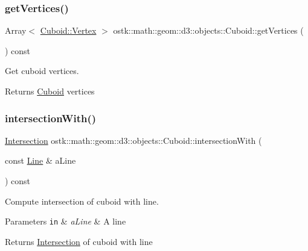 \subsubsection{\texorpdfstring{get\+Vertices()}{getVertices()}}
{\footnotesize\ttfamily Array$<$ \hyperlink{classostk_1_1math_1_1geom_1_1d3_1_1objects_1_1_cuboid_a0d3440e0c30348ece10f3658130e9b55}{Cuboid\+::\+Vertex} $>$ ostk\+::math\+::geom\+::d3\+::objects\+::\+Cuboid\+::get\+Vertices (\begin{DoxyParamCaption}{ }\end{DoxyParamCaption}) const}



Get cuboid vertices. 

\begin{DoxyReturn}{Returns}
\hyperlink{classostk_1_1math_1_1geom_1_1d3_1_1objects_1_1_cuboid}{Cuboid} vertices 
\end{DoxyReturn}
\mbox{\label{classostk_1_1math_1_1geom_1_1d3_1_1objects_1_1_cuboid_a821798e9d6f37cd6cafc6a34ef131f9a}} 
\subsubsection{\texorpdfstring{intersection\+With()}{intersectionWith()}\hspace{0.1cm}{\footnotesize\ttfamily [1/5]}}
{\footnotesize\ttfamily \hyperlink{classostk_1_1math_1_1geom_1_1d3_1_1_intersection}{Intersection} ostk\+::math\+::geom\+::d3\+::objects\+::\+Cuboid\+::intersection\+With (\begin{DoxyParamCaption}\item[{const \hyperlink{classostk_1_1math_1_1geom_1_1d3_1_1objects_1_1_line}{Line} \&}]{a\+Line }\end{DoxyParamCaption}) const}



Compute intersection of cuboid with line. 


\begin{DoxyParams}[1]{Parameters}
\mbox{\tt in}  & {\em a\+Line} & A line \\
\hline
\end{DoxyParams}
\begin{DoxyReturn}{Returns}
\hyperlink{classostk_1_1math_1_1geom_1_1d3_1_1_intersection}{Intersection} of cuboid with line 
\end{DoxyReturn}
\mbox{\label{classostk_1_1math_1_1geom_1_1d3_1_1objects_1_1_cuboid_a518146484563c222a5953aee578503b4}} 
